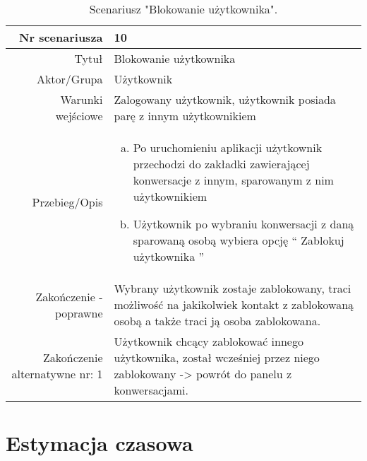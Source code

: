 \documentclass[12pt,a4paper]{article}
\begin{document}
\begin{table} [H]
\centering
\begin{tabular}{|r|p{9cm}|} \hline
Nr scenariusza & 10 \\
\hline
Tytuł & Blokowanie użytkownika \\
\hline
Aktor/Grupa & Użytkownik \\
\hline
Warunki wejściowe & Zalogowany użytkownik, użytkownik posiada parę z innym użytkownikiem \\
\hline
Przebieg/Opis & 
\begin{enumerate}[a)]
\item Po uruchomieniu aplikacji użytkownik przechodzi do zakładki zawierającej konwersacje z innym, sparowanym z nim użytkownikiem 
\item Użytkownik po wybraniu konwersacji z daną sparowaną osobą wybiera opcję “ Zablokuj użytkownika ”
\end{enumerate}
\\
\hline
Zakończenie - poprawne & Wybrany użytkownik zostaje zablokowany, traci możliwość na jakikolwiek kontakt z zablokowaną osobą a także traci ją osoba zablokowana.
\\ 
\hline
Zakończenie alternatywne nr: 1 & Użytkownik chcący zablokować innego użytkownika, został wcześniej przez niego zablokowany -> powrót do panelu z konwersacjami.
\\
\hline
\end{tabular}
\caption{Scenariusz "Blokowanie użytkownika".}
\label{table:10}
\end{table}



\renewcommand{\arraystretch}{1.5}


\newpage
\section{Estymacja czasowa}
\end{document}
